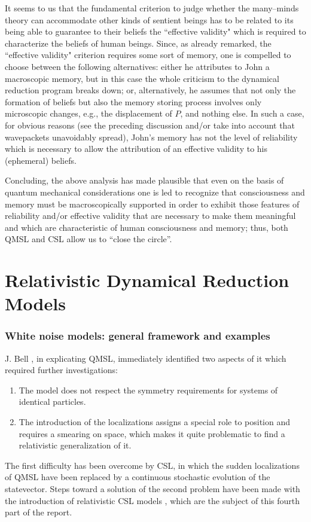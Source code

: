 \documentclass[12pt]{article}
\begin{document}
It seems to us that the fundamental criterion to judge whether the
many--minds theory can accommodate other kinds of sentient beings
has to be related to its being able to guarantee to their beliefs
the ``effective validity" which is required to characterize the
beliefs of human beings. Since, as already remarked, the
``effective validity" criterion requires some sort of memory, one
is compelled to choose between the following alternatives: either
he attributes to John a macroscopic memory, but in this case the
whole criticism to the dynamical reduction program breaks down;
or, alternatively, he assumes that not only the formation of
beliefs but also the memory storing process involves only
microscopic changes, e.g., the displacement of $P$, and nothing
else. In such a case, for obvious reasons (see the preceding
discussion and/or take into account that wavepackets unavoidably
spread), John's memory has not the level of reliability which is
necessary to allow the attribution of an effective validity to his
(ephemeral) beliefs.

Concluding, the above analysis has made plausible that even on the
basis of quantum mechanical considerations one is led to recognize
that consciousness and memory must be macroscopically supported in
order to exhibit those features of reliability and/or effective
validity that are necessary to make them meaningful and which are
characteristic of human consciousness and memory; thus, both QMSL
and CSL allow us to ``close the circle''.



\newpage

\part{Relativistic Dynamical Reduction Models}

\section{White noise models: general framework and examples}
\label{sec9}


J. Bell \cite{bells}, in explicating QMSL, immediately identified
two aspects of it which required further investigations:
\begin{enumerate}
\item The model does not respect the symmetry requirements for systems
of identical particles.
\item The introduction of the localizations assigns a special role to
position and requires a smearing on space, which makes it quite
problematic to find a relativistic generalization of it.
\end{enumerate}
The first difficulty has been overcome by CSL, in which the sudden
localizations of QMSL have been replaced by a continuous
stochastic evolution of the statevector. Steps toward a solution
of the second problem have been made with the introduction of
relativistic CSL models \cite{rel,rel2,p62,rel3,rel4}, which are the
subject of this fourth part of the report.
\end{document}
